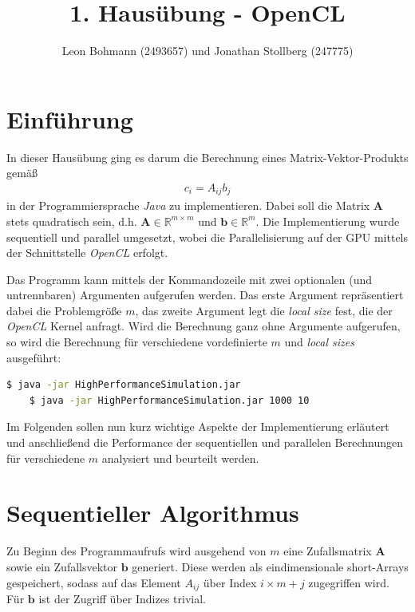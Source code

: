 \documentclass[
	ngerman,
	ruledheaders=section,
	class=report,
	thesis={type=Dokumentation},
	ignore-missing-data=true,
	accentcolor=9c,
	custommargins=false,
	marginpar=false,
	parskip=half-,
	fontsize=11pt,
]{tudapub}
\begin{document}

\title{1. Hausübung - OpenCL}
\author[]{Leon Bohmann (2493657) und Jonathan Stollberg (247775)}
\submissiondate{\today}

\maketitle
\tableofcontents

\chapter{Einführung}
In dieser Hausübung ging es darum die Berechnung eines Matrix-Vektor-Produkts gemäß
\begin{align*}
	c_{i} = A_{ij}b_{j}
\end{align*}
in der Programmiersprache \textit{Java} zu implementieren. Dabei soll die Matrix $\mathbf{A}$ stets quadratisch sein, d.h. $\mathbf{A} \in \mathbb{R}^{m\times m}$ und $\mathbf{b} \in \mathbb{R}^{m}$. Die Implementierung wurde sequentiell und parallel umgesetzt, wobei die Parallelisierung auf der GPU mittels der Schnittstelle \textit{OpenCL} erfolgt. %

Das Programm kann mittels der Kommandozeile mit zwei optionalen (und untrennbaren) Argumenten aufgerufen werden. Das erste Argument repräsentiert dabei die Problemgröße $m$, das zweite Argument legt die \textit{local size} fest, die der \textit{OpenCL} Kernel anfragt. Wird die Berechnung ganz ohne Argumente aufgerufen, so wird die Berechnung für verschiedene vordefinierte $m$ und \textit{local sizes} ausgeführt:
\begin{lstlisting}[language=bash]
	$ java -jar HighPerformanceSimulation.jar
	$ java -jar HighPerformanceSimulation.jar 1000 10
\end{lstlisting}

Im Folgenden sollen nun kurz wichtige Aspekte der Implementierung erläutert und anschließend die Performance der sequentiellen und parallelen Berechnungen für verschiedene $m$ analysiert und beurteilt werden.

\chapter{Sequentieller Algorithmus}
Zu Beginn des Programmaufrufs wird ausgehend von $m$ eine Zufallsmatrix $\mathbf{A}$ sowie ein Zufallsvektor $\mathbf{b}$ generiert. Diese werden als eindimensionale short-Arrays gespeichert, sodass auf das Element $A_{ij}$ über Index $i\times m + j$ zugegriffen wird. Für $\mathbf{b}$ ist der Zugriff über Indizes trivial.
\end{document}
